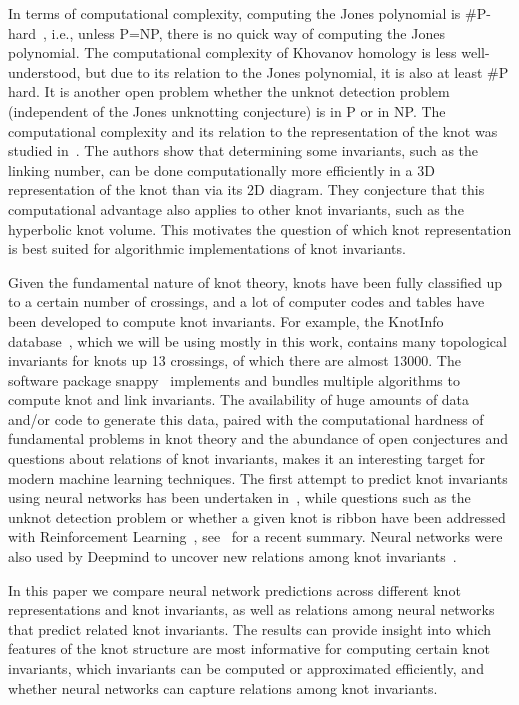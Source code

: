 \documentclass[11pt]{article}
\numberwithin{equation}{section}
\begin{document}
In terms of computational complexity, computing the Jones polynomial is \#P-hard~\cite{Jaeger:1990aaa}, i.e., unless P=NP, there is no quick way of computing the Jones polynomial. The computational complexity of Khovanov homology is less well-understood, but due to its relation to the Jones polynomial, it is also at least \#P hard. It is another open problem whether the unknot detection problem (independent of the Jones unknotting conjecture) is in P or in NP. The computational complexity and its relation to the representation of the knot was studied in~\cite{BarNatan:2024aaa}. The authors show that determining some invariants, such as the linking number, can be done computationally more efficiently in a 3D representation of the knot than via its 2D diagram. They conjecture that this computational advantage also applies to other knot invariants, such as the hyperbolic knot volume. This motivates the question of which knot representation is best suited for algorithmic implementations of knot invariants.

Given the fundamental nature of knot theory, knots have been fully classified up to a certain number of crossings, and a lot of computer codes and tables have been developed to compute knot invariants. For example, the KnotInfo database~\cite{knotinfo}, which we will be using mostly in this work, contains many topological invariants for knots up 13 crossings, of which there are almost 13000. The software package snappy~\cite{SnapPy} implements and bundles multiple algorithms to compute knot and link invariants. The availability of huge amounts of data and/or code to generate this data, paired with the computational hardness of fundamental problems in knot theory and the abundance of open conjectures and questions about relations of knot invariants, makes it an interesting target for modern machine learning techniques. The first attempt to predict knot invariants using neural networks has been undertaken in~\cite{hughes2016}, while questions such as the unknot detection problem or whether a given knot is ribbon have been addressed with Reinforcement Learning~\cite{Gukov:2020qaj, Gukov:2023kvx}, see~\cite{Gukov:2024buj} for a recent summary. Neural networks were also used by Deepmind to uncover new relations among knot invariants~\cite{Davies:2021Advancing}.

In this paper we compare neural network predictions across different knot representations and knot invariants, as well as relations among neural networks that predict related knot invariants. The results can provide insight into which features of the knot structure are most informative for computing certain knot invariants, which invariants can be computed or approximated efficiently, and whether neural networks can capture relations among knot invariants. 
\end{document}
